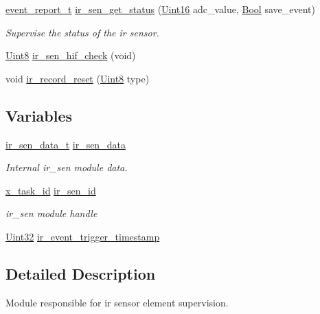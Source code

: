 \begin{DoxyCompactItemize}
\hyperlink{a00021_d6/d66/a00441}{event\+\_\+report\+\_\+t} \hyperlink{a00045_a5bba51487aeccd791ff56017124da833}{ir\+\_\+sen\+\_\+get\+\_\+status} (\hyperlink{a00072_a59a9f6be4562c327cbfb4f7e8e18f08b}{Uint16} adc\+\_\+value, \hyperlink{a00072_a253b248072cfc8bd812c69acd0046eed}{Bool} save\+\_\+event)
\begin{DoxyCompactList}\small\item\em Supervise the status of the ir sensor. \end{DoxyCompactList}\item 
\hyperlink{a00072_af84840501dec18061d18a68c162a8fa2}{Uint8} \hyperlink{a00045_a86870a0e00601a92277e689447739ce9}{ir\+\_\+sen\+\_\+hif\+\_\+check} (void)
\item 
void \hyperlink{a00045_a1c9872e93491d95a24ab0bc723d39a74}{ir\+\_\+record\+\_\+reset} (\hyperlink{a00072_af84840501dec18061d18a68c162a8fa2}{Uint8} type)
\end{DoxyCompactItemize}
\subsection*{Variables}
\begin{DoxyCompactItemize}
\item 
\hyperlink{a00023_d6/d21/a00573}{ir\+\_\+sen\+\_\+data\+\_\+t} \hyperlink{a00045_a73dfacb46242746440accc76c7ef710d}{ir\+\_\+sen\+\_\+data}
\begin{DoxyCompactList}\small\item\em Internal ir\+\_\+sen module data. \end{DoxyCompactList}\item 
\hyperlink{a00036_ad5c3c5fbfd3e4aadf22830395484a71d}{x\+\_\+task\+\_\+id} \hyperlink{a00045_a624782f67b3870f0dde83528770ef5fc}{ir\+\_\+sen\+\_\+id}
\begin{DoxyCompactList}\small\item\em ir\+\_\+sen module handle \end{DoxyCompactList}\item 
\hyperlink{a00072_aba99025e657f892beb7ff31cecf64653}{Uint32} \hyperlink{a00045_a6951f534a479b17c02d7da3ad6489634}{ir\+\_\+event\+\_\+trigger\+\_\+timestamp}
\end{DoxyCompactItemize}


\subsection{Detailed Description}
Module responsible for ir sensor element supervision. 



